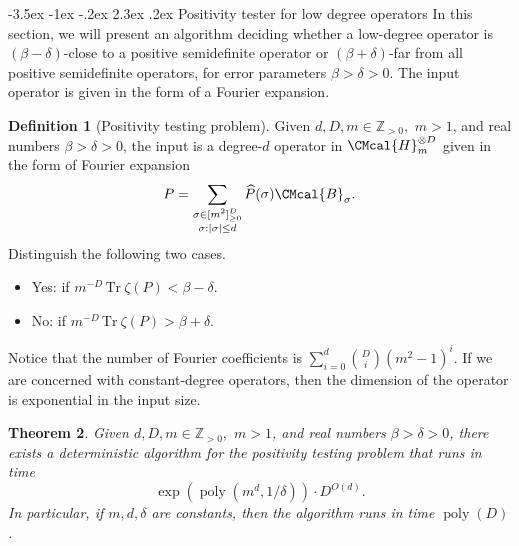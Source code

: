 \documentclass[10pt,a4paper]{article}
\makeatletter
\renewcommand{\section}{\@startsection {section}{1}{\z@}%
             {-3.5ex \@plus -1ex \@minus -.2ex}%
             {2.3ex \@plus .2ex}%
             {\normalfont\Large\scshape\bfseries}}
\def\B{\CMcal{B}}
\def\H{\CMcal{H}}
\theoremstyle{plain}
\newtheorem{theorem}{Theorem}[section]
\theoremstyle{definition}
\newtheorem{definition}[theorem]{Definition}
\newcommand {\br} [1] {\ensuremath{ \left( #1 \right) }}
\DeclarePairedDelimiter{\abs}{\lvert}{\rvert}
\newcommand {\Tr} {\ensuremath{ \mathrm{Tr} }}
\newcommand{\posint}{{\mathbb Z}_{>0}}
\newcommand{\herspace}[1]{\ensuremath{\H_m^{\otimes #1}}}
\newcommand{\poly} {\ensuremath{\operatorname{poly}}}
\newcommand{\dlbo} {\ensuremath{{D}}}
\newcommand{\1}{\mathbb{1}} %
\makeatother
\begin{document}
%
\section{Positivity tester for low degree operators}\label{sec:positivitytesting}
In this section, we will present an algorithm deciding whether a low-degree operator is $\br{\beta-\delta}$-close to a positive semidefinite operator or $\br{\beta+\delta}$-far from all positive semidefinite operators,
for error parameters $\beta>\delta>0$.
The input operator is given in the form of a Fourier expansion. 
\begin{definition}[Positivity testing problem]\label{def:postest}
Given $d, \dlbo, m\in\posint,$ $m>1$, and real numbers $\beta>\delta> 0$, the input is a degree-$d$ operator in $\herspace{\dlbo}$ given in the form of Fourier expansion
$$P=\sum_{\substack{\sigma\in[m^2]_{\ge 0}^\dlbo\\\sigma: \abs{\sigma}\le d}}\widehat{P}(\sigma)\B_\sigma.$$
Distinguish the following two cases.
\begin{itemize}
    \item Yes: if $m^{-\dlbo}\,\Tr~\zeta(P)<\beta-\delta$.
    \item No: if $m^{-\dlbo}\,\Tr~\zeta(P)>\beta+\delta$.
\end{itemize}
\end{definition}
Notice that the number of Fourier coefficients is $\sum_{i=0}^d{\binom{\dlbo}{i} }\br{m^2-1}^i$. If we are concerned with constant-degree operators, then the dimension of the operator is exponential in the input size.




\begin{theorem}\label{thm:psd-test}
  Given $d, \dlbo, m\in\posint,$ $m>1$, and real numbers $\beta>\delta> 0$,
there exists a deterministic algorithm for the positivity testing problem that runs in time
  $$\exp\br{\poly\br{m^d, 1/\delta}}\cdot \dlbo^{O(d)}.$$
  In particular, if $m,d,\delta$ are constants, then the algorithm runs in time $\poly(\dlbo)$.
\end{theorem}
\end{document}
